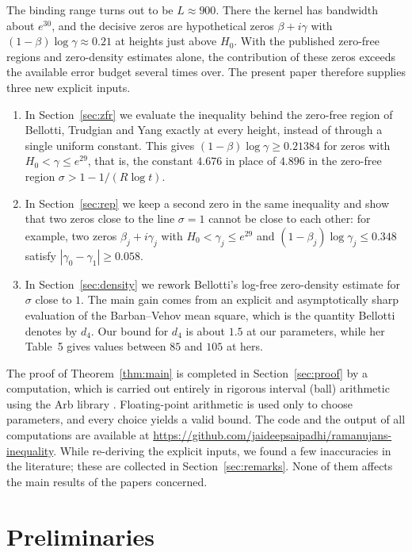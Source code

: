 \documentclass[11pt]{amsart}
\numberwithin{equation}{section}
\theoremstyle{definition}
\theoremstyle{remark}
\begin{document}
The binding range turns out to be $L \approx 900$.
There the kernel has bandwidth about $e^{30}$, and the decisive zeros are hypothetical zeros $\beta + i\gamma$ with $(1-\beta)\log\gamma \approx 0.21$ at heights just above $H_0$.
With the published zero-free regions and zero-density estimates alone, the contribution of these zeros exceeds the available error budget several times over.
The present paper therefore supplies three new explicit inputs.
\begin{enumerate}
\item In Section~\ref{sec:zfr} we evaluate the inequality behind the zero-free region of Bellotti, Trudgian and Yang \cite{BTY} exactly at every height, instead of through a single uniform constant.
This gives $(1-\beta)\log\gamma \geq 0.21384$ for zeros with $H_0 < \gamma \leq e^{29}$, that is, the constant $4.676$ in place of $4.896$ in the zero-free region $\sigma > 1 - 1/(R\log t)$.
\item In Section~\ref{sec:rep} we keep a second zero in the same inequality and show that two zeros close to the line $\sigma = 1$ cannot be close to each other: for example, two zeros $\beta_j + i\gamma_j$ with $H_0 < \gamma_j \leq e^{29}$ and $(1-\beta_j)\log\gamma_j \leq 0.348$ satisfy $|\gamma_0 - \gamma_1| \geq 0.058$.
\item In Section~\ref{sec:density} we rework Bellotti's log-free zero-density estimate \cite{Bellotti} for $\sigma$ close to $1$.
The main gain comes from an explicit and asymptotically sharp evaluation of the Barban--Vehov mean square, which is the quantity Bellotti denotes by $d_4$.
Our bound for $d_4$ is about $1.5$ at our parameters, while her Table~5 gives values between $85$ and $105$ at hers.
\end{enumerate}
The proof of Theorem~\ref{thm:main} is completed in Section~\ref{sec:proof} by a computation, which is carried out entirely in rigorous interval (ball) arithmetic using the Arb library \cite{arb}.
Floating-point arithmetic is used only to choose parameters, and every choice yields a valid bound.
The code and the output of all computations are available at \url{https://github.com/jaideepsaipadhi/ramanujans-inequality}.
While re-deriving the explicit inputs, we found a few inaccuracies in the literature; these are collected in Section~\ref{sec:remarks}.
None of them affects the main results of the papers concerned.

\section{Preliminaries}\label{sec:prelim}
\end{document}

